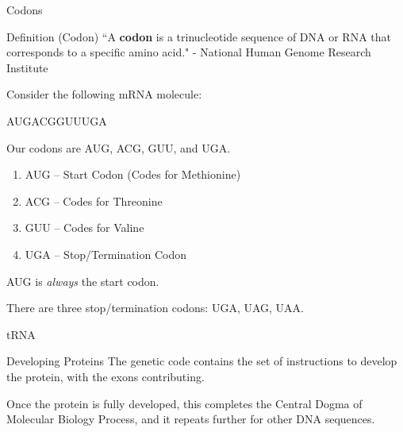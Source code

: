 \documentclass{beamer}
\begin{document}
\begin{frame}{Codons}
\begin{alertblock}{Definition (Codon)}
``A \textbf{codon} is a trinucleotide sequence of DNA or RNA that corresponds to a specific amino acid." - National Human Genome Research Institute
\end{alertblock}
Consider the following mRNA molecule:
\begin{center}
    AUGACGGUUUGA
\end{center}
Our codons are AUG, ACG, GUU, and UGA. 
\begin{enumerate}
    \item AUG -- Start Codon (Codes for Methionine)
    \item ACG -- Codes for Threonine 
    \item GUU -- Codes for Valine
    \item UGA -- Stop/Termination Codon
\end{enumerate}
AUG is \textit{always} the start codon.

There are three stop/termination codons: UGA, UAG, UAA.
\end{frame}

\begin{frame}{tRNA}

\end{frame}

\begin{frame}{Developing Proteins}
The genetic code contains the set of instructions to develop the protein, with the exons contributing. 

\bigskip Once the protein is fully developed, this completes the Central Dogma of Molecular Biology Process, and it repeats further for other DNA sequences.
\end{frame}
\end{document}
